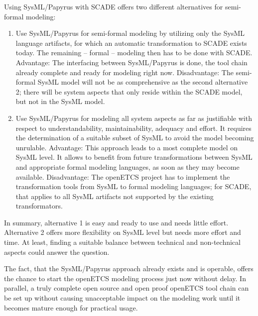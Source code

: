 Using SysML/Papyrus with SCADE offers two different alternatives for semi-formal modeling:


\begin{enumerate}
	\item Use SysML/Papyrus for semi-formal modeling by utilizing only the SysML language artifacts, for which an automatic transformation to SCADE exists today. The remaining – formal – modeling then has to be done with SCADE. 
Advantage: The interfacing between SysML/Papyrus is done, the tool chain already complete and ready for modeling right now.
Disadvantage: The semi-formal SysML model will not be as comprehensive as the second alternative 2; there will be system aspects that only reside within the SCADE model, but not in the SysML model.
	\item Use SysML/Papyrus for modeling all system aspects as far as justifiable with respect to understandability, maintainability, adequacy and effort. It requires the determination of a suitable subset of SysML to avoid the model becoming unrulable. 
Advantage: This approach leads to a most complete model on SysML level. It allows to benefit from future transformations between SysML and appropriate formal modeling languages, as soon as they may become available. 
Disadvantage: The openETCS project has to implement the transformation tools from SysML to formal modeling languages; for SCADE, that applies to all SysML artifacts not supported by the existing transformators.
\end{enumerate}

In summary, alternative 1 is easy and ready to use and needs little effort. Alternative 2 offers more flexibility on SysML level but needs more effort and time. 
At least, finding a suitable balance between technical and non-technical aspects could answer the question.  

The fact, that the SysML/Papyrus approach already exists and is operable, offers the chance to start the openETCS modeling process just now without delay. 
In parallel, a truly complete open source and open proof openETCS tool chain can be set up without causing unacceptable impact on the modeling work until it becomes mature enough for practical usage. 

